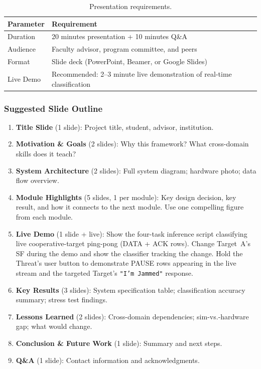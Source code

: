 \documentclass[11pt,letterpaper]{article}
\begin{document}
	\begin{table}[ht!]
		\centering
		\caption{Presentation requirements.}
		\label{tab:presentation}
		\renewcommand{\arraystretch}{1.3}
		\begin{tabularx}{\textwidth}{l X}
			\toprule
			\textbf{Parameter} & \textbf{Requirement} \\
			\midrule
			Duration & 20 minutes presentation + 10 minutes Q\&A \\
			Audience & Faculty advisor, program committee, and peers \\
			Format & Slide deck (PowerPoint, Beamer, or Google Slides) \\
			Live Demo & Recommended: 2--3 minute live demonstration of real-time classification \\
			\bottomrule
		\end{tabularx}
	\end{table}

	\subsubsection{Suggested Slide Outline}

	\begin{enumerate}[leftmargin=2em]
		\item \textbf{Title Slide} (1 slide): Project title, student, advisor, institution.
		\item \textbf{Motivation \& Goals} (2 slides): Why this framework? What cross-domain skills does it teach?
		\item \textbf{System Architecture} (2 slides): Full system diagram; hardware photo; data flow overview.
		\item \textbf{Module Highlights} (5 slides, 1 per module): Key design decision, key result, and how it connects to the next module. Use one compelling figure from each module.
		\item \textbf{Live Demo} (1 slide + live): Show the four-task inference script classifying live cooperative-target ping-pong (DATA + ACK rows). Change Target~A's SF during the demo and show the classifier tracking the change. Hold the Threat's user button to demonstrate PAUSE rows appearing in the live stream and the targeted Target's \texttt{"I'm Jammed"} response.
		\item \textbf{Key Results} (3 slides): System specification table; classification accuracy summary; stress test findings.
		\item \textbf{Lessons Learned} (2 slides): Cross-domain dependencies; sim-vs.-hardware gap; what would change.
		\item \textbf{Conclusion \& Future Work} (1 slide): Summary and next steps.
		\item \textbf{Q\&A} (1 slide): Contact information and acknowledgments.
	\end{enumerate}
\end{document}
